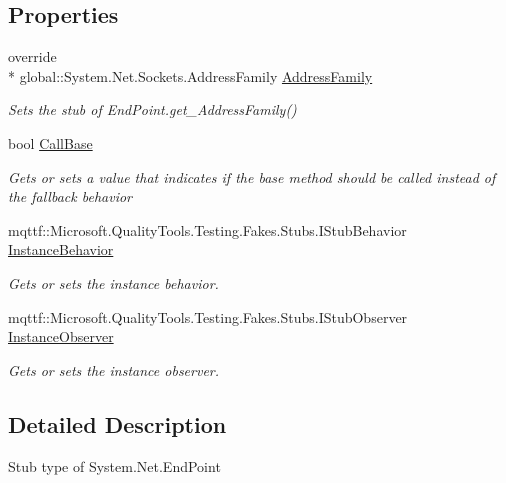 \subsection*{Properties}
\begin{DoxyCompactItemize}
\item 
override \\*
global\-::\-System.\-Net.\-Sockets.\-Address\-Family \hyperlink{class_system_1_1_net_1_1_fakes_1_1_stub_end_point_a318a7aa0125d1a945a8eb4a773101eb7}{Address\-Family}
\begin{DoxyCompactList}\small\item\em Sets the stub of End\-Point.\-get\-\_\-\-Address\-Family()\end{DoxyCompactList}\item 
bool \hyperlink{class_system_1_1_net_1_1_fakes_1_1_stub_end_point_a7a3941b78a8fd795693ee8c4cc5d4a14}{Call\-Base}
\begin{DoxyCompactList}\small\item\em Gets or sets a value that indicates if the base method should be called instead of the fallback behavior\end{DoxyCompactList}\item 
mqttf\-::\-Microsoft.\-Quality\-Tools.\-Testing.\-Fakes.\-Stubs.\-I\-Stub\-Behavior \hyperlink{class_system_1_1_net_1_1_fakes_1_1_stub_end_point_a50a2b6823c5ab8e5b170ca1c3cf925f5}{Instance\-Behavior}
\begin{DoxyCompactList}\small\item\em Gets or sets the instance behavior.\end{DoxyCompactList}\item 
mqttf\-::\-Microsoft.\-Quality\-Tools.\-Testing.\-Fakes.\-Stubs.\-I\-Stub\-Observer \hyperlink{class_system_1_1_net_1_1_fakes_1_1_stub_end_point_a8de72cf51bcf170a7312fda400daae55}{Instance\-Observer}
\begin{DoxyCompactList}\small\item\em Gets or sets the instance observer.\end{DoxyCompactList}\end{DoxyCompactItemize}


\subsection{Detailed Description}
Stub type of System.\-Net.\-End\-Point



